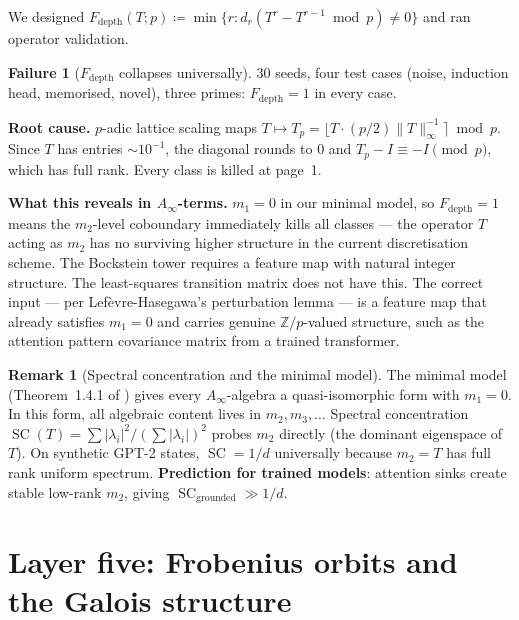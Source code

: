 \documentclass[11pt]{amsart}
\theoremstyle{definition}
\newtheorem{remark}[theorem]{Remark}
\newtheorem{failure}[theorem]{Failure}
\newcommand{\defeq}{\coloneqq}
\DeclareMathOperator{\SC}{SC}
\begin{document}
We designed $F_{\mathrm{depth}}(T; p) \defeq \min\{r : d_r(T^r - T^{r-1} \bmod p) \neq 0\}$
and ran operator validation.

\begin{failure}[$F_\mathrm{depth}$ collapses universally]
\label{fail:fdepth}
30 seeds, four test cases (noise, induction head, memorised, novel),
three primes: $F_\mathrm{depth} = 1$ in every case.

\textbf{Root cause.}
$p$-adic lattice scaling maps $T \mapsto T_p = \lfloor T \cdot (p/2)\|T\|_\infty^{-1}\rceil \bmod p$.
Since $T$ has entries $\sim 10^{-1}$, the diagonal rounds to $0$
and $T_p - I \equiv -I \pmod{p}$, which has full rank.
Every class is killed at page~1.

\textbf{What this reveals in $A_\infty$-terms.}
$m_1 = 0$ in our minimal model, so $F_\mathrm{depth} = 1$ means the
$m_2$-level coboundary immediately kills all classes ---
the operator $T$ acting as $m_2$ has no surviving higher structure
in the current discretisation scheme.
The Bockstein tower requires a feature map with natural integer structure.
The least-squares transition matrix does not have this.
The correct input --- per Lefèvre-Hasegawa's perturbation lemma --- is
a feature map that already satisfies $m_1 = 0$ and carries genuine
$\mathbb{Z}/p$-valued structure, such as the attention pattern covariance
matrix from a trained transformer.
\end{failure}

\begin{remark}[Spectral concentration and the minimal model]
The minimal model (Theorem~1.4.1 of \cite{LFH03}) gives every
$A_\infty$-algebra a quasi-isomorphic form with $m_1 = 0$.
In this form, all algebraic content lives in $m_2, m_3, \ldots$
Spectral concentration $\SC(T) = \sum |\lambda_i|^2 / (\sum |\lambda_i|)^2$
probes $m_2$ directly (the dominant eigenspace of $T$).
On synthetic GPT-2 states, $\SC = 1/d$ universally because $m_2 = T$
has full rank uniform spectrum.
\textbf{Prediction for trained models}: attention sinks create
stable low-rank $m_2$, giving $\SC_{\mathrm{grounded}} \gg 1/d$.
\end{remark}

\section{Layer five: Frobenius orbits and the Galois structure}
\label{sec:galois}
\end{document}
